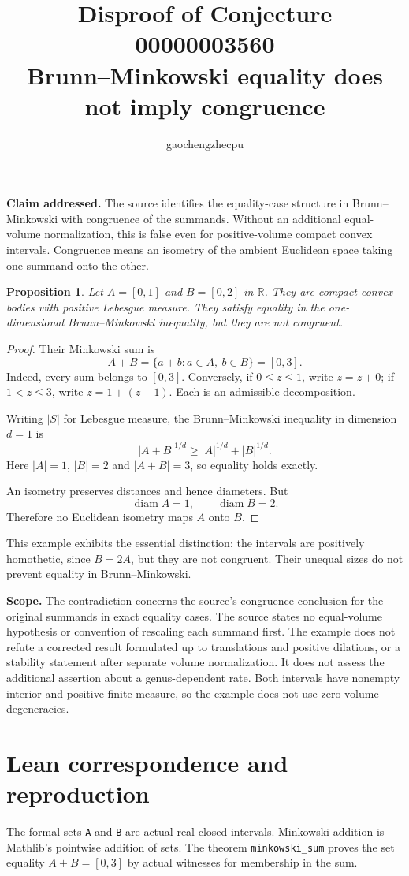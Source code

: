 \documentclass[11pt]{article}
\title{Disproof of Conjecture 00000003560\\Brunn--Minkowski equality does not imply congruence}
\author{gaochengzhecpu}\date{}
\newtheorem{proposition}{Proposition}
\begin{document}
\maketitle
\noindent\textbf{Claim addressed.} The source identifies the equality-case structure in Brunn--Minkowski with congruence of the summands. Without an additional equal-volume normalization, this is false even for positive-volume compact convex intervals. Congruence means an isometry of the ambient Euclidean space taking one summand onto the other.

\begin{proposition}
Let $A=[0,1]$ and $B=[0,2]$ in $\mathbb R$. They are compact convex bodies with positive Lebesgue measure. They satisfy equality in the one-dimensional Brunn--Minkowski inequality, but they are not congruent.
\end{proposition}
\begin{proof}
Their Minkowski sum is
\[
 A+B=\{a+b:a\in A,\ b\in B\}=[0,3].
\]
Indeed, every sum belongs to $[0,3]$. Conversely, if $0\le z\le1$, write $z=z+0$; if $1<z\le3$, write $z=1+(z-1)$. Each is an admissible decomposition.

Writing $|S|$ for Lebesgue measure, the Brunn--Minkowski inequality in dimension $d=1$ is
\[
 |A+B|^{1/d}\ge |A|^{1/d}+|B|^{1/d}.
\]
Here $|A|=1$, $|B|=2$ and $|A+B|=3$, so equality holds exactly.

An isometry preserves distances and hence diameters. But
\[
 \operatorname{diam} A=1,\qquad \operatorname{diam} B=2.
\]
Therefore no Euclidean isometry maps $A$ onto $B$.
\end{proof}

This example exhibits the essential distinction: the intervals are positively homothetic, since $B=2A$, but they are not congruent. Their unequal sizes do not prevent equality in Brunn--Minkowski.

\noindent\textbf{Scope.} The contradiction concerns the source's congruence conclusion for the original summands in exact equality cases. The source states no equal-volume hypothesis or convention of rescaling each summand first. The example does not refute a corrected result formulated up to translations and positive dilations, or a stability statement after separate volume normalization. It does not assess the additional assertion about a genus-dependent rate. Both intervals have nonempty interior and positive finite measure, so the example does not use zero-volume degeneracies.

\section*{Lean correspondence and reproduction}
The formal sets \texttt{A} and \texttt{B} are actual real closed intervals. Minkowski addition is Mathlib's pointwise addition of sets. The theorem \texttt{minkowski\_sum} proves the set equality $A+B=[0,3]$ by actual witnesses for membership in the sum.
\end{document}
